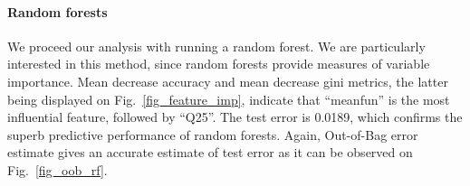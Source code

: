 \paragraph{Random forests}
We proceed our analysis with running a random forest. We are particularly interested in this method, since random forests provide measures of variable importance. Mean decrease accuracy and mean decrease gini metrics, the latter being displayed on Fig.~\ref{fig_feature_imp}, indicate that ``meanfun'' is the most influential feature, followed by ``Q25''. The test error is \num{0.0189}, which confirms the superb predictive performance of random forests. Again, Out-of-Bag error estimate gives an accurate estimate of test error as it can be observed on Fig.~\ref{fig_oob_rf}.

